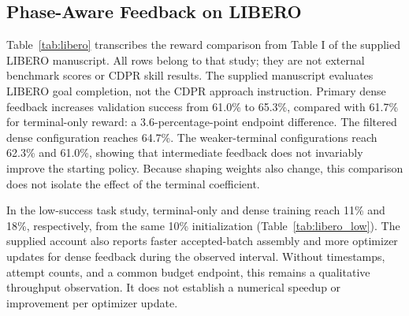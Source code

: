 \subsection{Phase-Aware Feedback on LIBERO}\label{sec:libero_results}
Table~\ref{tab:libero} transcribes the reward comparison from Table I of the supplied LIBERO manuscript. All rows belong to that study; they are not external benchmark scores or CDPR skill results. The supplied manuscript evaluates LIBERO goal completion, not the CDPR approach instruction. Primary dense feedback increases validation success from 61.0\% to 65.3\%, compared with 61.7\% for terminal-only reward: a 3.6-percentage-point endpoint difference. The filtered dense configuration reaches 64.7\%. The weaker-terminal configurations reach 62.3\% and 61.0\%, showing that intermediate feedback does not invariably improve the starting policy. Because shaping weights also change, this comparison does not isolate the effect of the terminal coefficient.


In the low-success task study, terminal-only and dense training reach 11\% and 18\%, respectively, from the same 10\% initialization (Table~\ref{tab:libero_low}). The supplied account also reports faster accepted-batch assembly and more optimizer updates for dense feedback during the observed interval. Without timestamps, attempt counts, and a common budget endpoint, this remains a qualitative throughput observation. It does not establish a numerical speedup or improvement per optimizer update.


